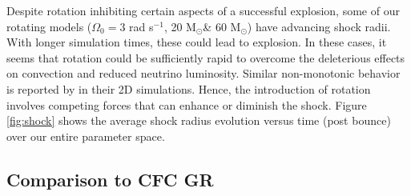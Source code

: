 \documentclass[twocolumn,times]{aastex62}  %
\newcommand{\Msun}{\ensuremath{\mathrm{M}_\odot}\xspace}
\begin{document}
Despite rotation inhibiting certain aspects of a successful explosion, some of our rotating models ($\Omega_0 = 3$ rad s$^{-1}$, 20 \Msun \& 60 \Msun) have advancing shock radii.  With longer simulation times, these could lead to explosion.  In these cases, it seems that rotation could be sufficiently rapid to overcome the deleterious effects on convection and reduced neutrino luminosity.
Similar non-monotonic behavior is reported by \citet{summa:2018} in their 2D simulations.
Hence, the introduction of rotation involves competing forces that can enhance or diminish the shock.  Figure \ref{fig:shock} shows the average shock radius evolution versus time (post bounce) over our entire parameter space.



\subsection{Comparison to CFC GR}
\end{document}
